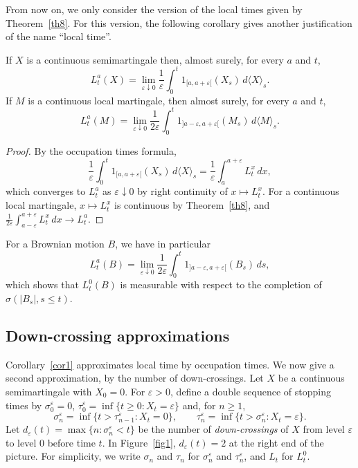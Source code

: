 From now on, we only consider the version of the local times given by
Theorem~\ref{th8}. For this version, the following corollary gives another
justification of the name ``local time''.

\begin{corollary}\label{cor1}
	If $X$ is a continuous semimartingale then, almost surely, for every $a$
	and $t$,
	\[
		L_t^a(X)=\lim_{\varepsilon \downarrow 0} \frac{1}{\varepsilon}
		\int_0^t 1_{[a,a+\varepsilon[}(X_s)\,d\langle X\rangle_s .
	\]
	If $M$ is a continuous local martingale, then almost surely, for every $a$
	and $t$,
	\[
		L_t^a(M)=\lim_{\varepsilon \downarrow 0} \frac{1}{2\varepsilon}
		\int_0^t 1_{]a-\varepsilon , a+\varepsilon[}(M_s)\,d\langle M\rangle_s .
	\]
\end{corollary}

\begin{proof}
	By the occupation times formula,
	\[
		\frac{1}{\varepsilon}\int_0^t 1_{[a,a+\varepsilon[}(X_s)\,d\langle X\rangle_s
		= \frac{1}{\varepsilon}\int_a^{a+\varepsilon} L^x_t\, dx,
	\]
	which converges to $L^a_t$ as $\varepsilon\downarrow 0$ by right continuity of
	$x\mapsto L^x_t$. For a continuous local martingale, $x\mapsto L^x_t$ is
	continuous by Theorem~\ref{th8}, and
	$\frac{1}{2\varepsilon}\int_{a-\varepsilon}^{a+\varepsilon} L^x_t\, dx \to L^a_t$.
\end{proof}

\begin{remark}
	For a Brownian motion $B$, we have in particular
	\[
		L_t^a(B)=\lim_{\varepsilon \downarrow 0} \frac{1}{2\varepsilon}
		\int_0^t 1_{]a-\varepsilon , a+\varepsilon[}(B_s)\,ds,
	\]
	which shows that $L_t^0(B)$ is measurable with respect to the completion of
	$\sigma(|B_s| , s\leqslant t)$.
\end{remark}

\subsection{Down-crossing approximations}

Corollary~\ref{cor1} approximates local time by occupation times. We now give
a second approximation, by the number of down-crossings. Let $X$ be a
continuous semimartingale with $X_0 = 0$. For $\varepsilon > 0$, define a double
sequence of stopping times by $\sigma_0^\varepsilon = 0$,
$\tau_0^\varepsilon = \inf\{t\geqslant 0: X_t= \varepsilon \}$ and, for
$n\geqslant 1$,
\[
	\sigma_n^\varepsilon = \inf\{t > \tau_{n-1}^\varepsilon : X_t= 0 \}, \qquad
	\tau_n^\varepsilon =\inf\{t > \sigma_{n}^\varepsilon : X_t= \varepsilon \} .
\]
Let $d_\varepsilon (t)=\max\{ n: \sigma_n^\varepsilon < t \}$ be the number of
\emph{down-crossings} of $X$ from level $\varepsilon$ to level $0$ before time
$t$. In Figure~\ref{fig1}, $d_\varepsilon (t)=2$ at the right end of the
picture. For simplicity, we write $\sigma_n$ and $\tau_n$ for
$\sigma_n^\varepsilon$ and $\tau_n^\varepsilon$, and $L_t$ for $L_t^0$.

